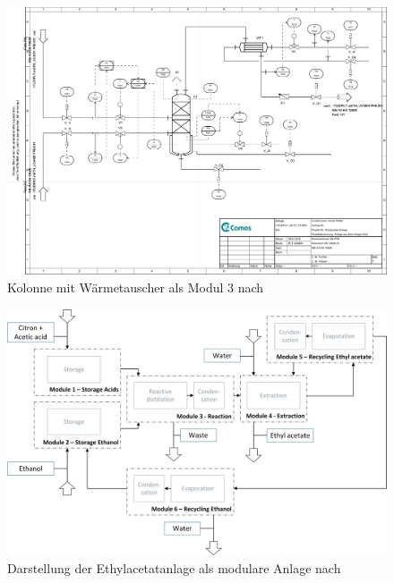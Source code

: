 \begin{figure}[h!tb]
\centering
\includegraphics[height=\textwidth,angle=90]{bilder/M03_Kolonne_mit_Waermetauscher.pdf}
\caption[PID Modul 3]{Kolonne mit W\"armetauscher als Modul 3 nach \cite{Pfeffer_2016}}
\label{fig:PIDMod3}
\end{figure}

\begin{figure}[h!tb]
\centering
\includegraphics[width=\textheight,angle=90]{bilder/mETH_V3_eng.png}
\caption[Modulare Gesamtanlage]{Darstellung der Ethylacetatanlage als modulare Anlage nach \cite{Pfeffer_2016}}
\label{fig:PIDGes}
\end{figure}

